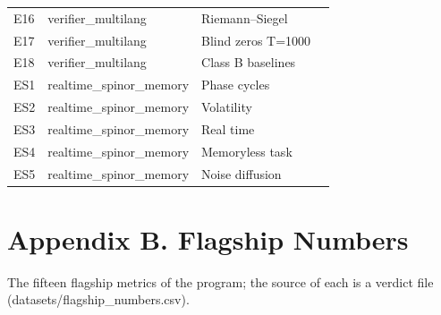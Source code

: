 \documentclass[11pt,a4paper]{article}
\begin{document}
\begin{table}[htbp]
\begin{tabular}{p{} p{} p{} p{}}
E16 & verifier\_multilang & Riemann–Siegel &  \\
E17 & verifier\_multilang & Blind zeros T=1000 &  \\
E18 & verifier\_multilang & Class B baselines &  \\
ES1 & realtime\_spinor\_memory & Phase cycles &  \\
ES2 & realtime\_spinor\_memory & Volatility &  \\
ES3 & realtime\_spinor\_memory & Real time &  \\
ES4 & realtime\_spinor\_memory & Memoryless task &  \\
ES5 & realtime\_spinor\_memory & Noise diffusion &  \\
\bottomrule
\end{tabular}
\end{table}

\section{Appendix B. Flagship Numbers}

The fifteen flagship metrics of the program; the source of each is a verdict file (datasets/flagship\_numbers.csv).
\end{document}
